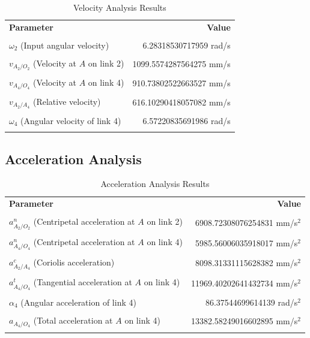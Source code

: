 \documentclass[12pt]{article}
\begin{document}
\begin{table}[h]
\centering
\begin{tabular}{|l|r|}
\hline
\textbf{Parameter} & \textbf{Value} \\\\
\hline
$\omega_2$ (Input angular velocity) & 6.28318530717959 rad/s \\\\
$v_{A_2/O_2}$ (Velocity at $A$ on link 2) & 1099.5574287564275 mm/s \\\\
$v_{A_4/O_4}$ (Velocity at $A$ on link 4) & 910.73802522663527 mm/s \\\\
$v_{A_2/A_4}$ (Relative velocity) & 616.10290418057082 mm/s \\\\
$\omega_4$ (Angular velocity of link 4) & 6.57220835691986 rad/s \\\\
\hline
\end{tabular}
\caption{Velocity Analysis Results}
\end{table}

\subsection*{Acceleration Analysis}

\begin{table}[h]
\centering
\begin{tabular}{|l|r|}
\hline
\textbf{Parameter} & \textbf{Value} \\\\
\hline
$a^n_{A_2/O_2}$ (Centripetal acceleration at $A$ on link 2) & 6908.72308076254831 mm/s$^2$ \\\\
$a^n_{A_4/O_4}$ (Centripetal acceleration at $A$ on link 4) & 5985.56006035918017 mm/s$^2$ \\\\
$a^c_{A_2/A_4}$ (Coriolis acceleration) & 8098.31331115628382 mm/s$^2$ \\\\
$a^t_{A_4/O_4}$ (Tangential acceleration at $A$ on link 4) & 11969.40202641432734 mm/s$^2$ \\\\
$\alpha_4$ (Angular acceleration of link 4) & 86.37544699614139 rad/s$^2$ \\\\
$a_{A_4/O_4}$ (Total acceleration at $A$ on link 4) & 13382.58249016602895 mm/s$^2$ \\\\
\hline
\end{tabular}
\caption{Acceleration Analysis Results}
\end{table}
\end{document}
